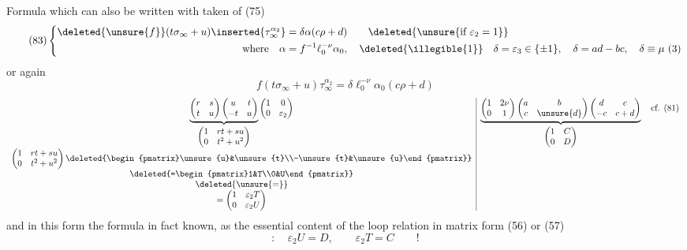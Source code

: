 Formula which can also be written
 with   taken of (75)
\[
\tag{83}
\left\{\begin{aligned}
\deleted{\unsure{f}}(t\sigma_\infty+u)\inserted{\tau_\infty^{\alpha_2}}
&=\delta\alpha(c\rho+d)
\qquad\deleted{\unsure{\text{if }\varepsilon_2=1}}\\
\text{where}\quad\alpha&=f^{-1}\ell_0^{-\nu}\alpha_0,
\quad\deleted{\illegible{1}}\quad
\delta=\varepsilon_3\in\{\pm1\},\quad\delta=ad-bc,\quad\delta\equiv\mu\ (3)
\end{aligned}\right.
\]
or again
\[
\tag{84}
f(t\sigma_\infty+u)\tau_\infty^{\alpha_2}
=\delta\ell_0^{-\nu}\alpha_0(c\rho+d)
\]
\[
\begin{array}{c|c}
\underbrace{
\begin{pmatrix}r&s\\t&u\end{pmatrix}
\begin{pmatrix}u&t\\-t&u\end{pmatrix}
}_{\displaystyle\begin{pmatrix}1&rt+su\\0&t^2+u^2\end{pmatrix}}
\begin{pmatrix}1&0\\0&\varepsilon_2\end{pmatrix}
&
\underbrace{
\begin{pmatrix}1&2\nu\\0&1\end{pmatrix}
\begin{pmatrix}a&b\\c&\unsure{d}\end{pmatrix}
\begin{pmatrix}d&c\\-c&c+d\end{pmatrix}
}_{\displaystyle\begin{pmatrix}1&C\\0&D\end{pmatrix}}
\quad\text{cf. (81)}\\
\begin{pmatrix}1&rt+su\\0&t^2+u^2\end{pmatrix}\deleted{\begin{pmatrix}\unsure{u}&\unsure{t}\\-\unsure{t}&\unsure{u}\end{pmatrix}}&\\
\deleted{=\begin{pmatrix}1&T\\0&U\end{pmatrix}}&\\
\deleted{\unsure{=}}&\\
=\begin{pmatrix}1&\varepsilon_2T\\0&\varepsilon_2U\end{pmatrix}&
\end{array}
\]
and in this form the formula  in fact known,
as the essential content of the  loop relation in matrix form (56) or (57)
\[
:\quad\varepsilon_2U=D,\qquad\varepsilon_2T=C\qquad!
\]

